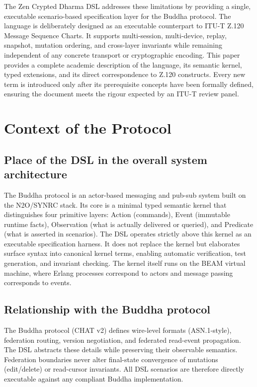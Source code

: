 \documentclass{article}
\begin{document}
The Zen Crypted Dharma DSL addresses these limitations by providing a single, executable scenario-based
specification layer for the Buddha protocol. The language is deliberately designed as an executable
counterpart to ITU-T Z.120 Message Sequence Charts. It supports multi-session, multi-device, replay,
snapshot, mutation ordering, and cross-layer invariants while remaining independent of any concrete
transport or cryptographic encoding. This paper provides a complete academic description of the language,
its semantic kernel, typed extensions, and its direct correspondence to Z.120 constructs. Every new term
is introduced only after its prerequisite concepts have been formally defined, ensuring the document
meets the rigour expected by an ITU-T review panel.

\section{Context of the Protocol}

\subsection{Place of the DSL in the overall system architecture}

The Buddha protocol is an actor-based messaging and pub-sub system built on the N2O/SYNRC stack.
Its core is a minimal typed semantic kernel that distinguishes four primitive layers: Action (commands),
Event (immutable runtime facts), Observation (what is actually delivered or queried),
and Predicate (what is asserted in scenarios). The DSL operates strictly above this kernel as
an executable specification harness. It does not replace the kernel but elaborates surface
syntax into canonical kernel terms, enabling automatic verification, test generation, and invariant checking.
The kernel itself runs on the BEAM virtual machine, where Erlang processes correspond to actors and message
passing corresponds to events.

\subsection{Relationship with the Buddha protocol}

The Buddha protocol (CHAT v2) defines wire-level formats (ASN.1-style), federation routing,
version negotiation, and federated read-event propagation. The DSL abstracts these details while
preserving their observable semantics. Federation boundaries never alter final-state convergence
of mutations (edit/delete) or read-cursor invariants. All DSL scenarios are therefore directly
executable against any compliant Buddha implementation.
\end{document}
